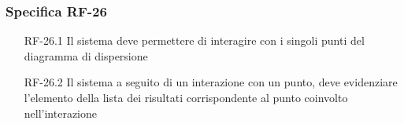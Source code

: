 \subsubsection{Specifica RF-26}
\label{subsubsec:RF-26}
\begin{enumerate}
    \item[RF-26.1] Il sistema deve permettere di interagire con i singoli punti del diagramma di dispersione
    \item[RF-26.2] Il sistema a seguito di un interazione con un punto, deve evidenziare l'elemento della lista dei risultati corrispondente al punto coinvolto nell'interazione
\end{enumerate}




